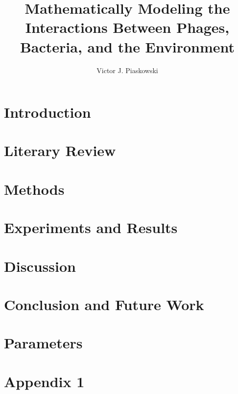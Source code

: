 \documentclass[titlepage]{article}
\begin{document}
\title{Mathematically Modeling the Interactions Between Phages,  Bacteria, and the Environment}
\author{Victor J. Piaskowski}
\maketitle
\begin{abstract}
    
\end{abstract}
\newpage


\newpage

\tableofcontents
\newpage 
{}
\section{Introduction}
\label{sec:Introduction}

\newpage

\section{Literary Review}
\label{sec:Literature}

\newpage

\section{Methods}
\label{sec:Methods}

\newpage

\section{Experiments and Results}
    \label{sec:Experiments}
    
    \newpage

\section{Discussion}
    \label{sec:Discussion}
    
    \newpage

\section{Conclusion and Future Work}
    \label{sec:Conclusion}
    
    \newpage

\printbibliography[heading=bibintoc, title={References}]
\newpage

\appendix 
\section{Parameters}
    \label{sec:Parameters}
    
    \newpage

\section{Appendix 1}
    \label{sec:Appendix1}
    
    \newpage
\end{document}
